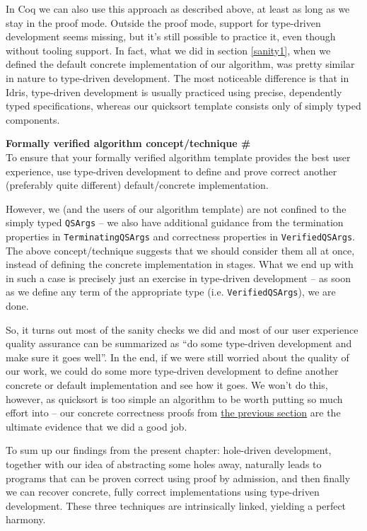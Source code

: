\documentclass[declaration,mgr,english,shortabstract]{iithesis}
\newcommand{\m}[1]{\texttt{#1}}
\newcounter{cnt}
\newcommand{\runcnt}{\#\arabic{cnt}}
\newcommand{\concept}[1]
{
    \refstepcounter{cnt}
    \begin{center}
        \textbf{Formally verified algorithm concept/technique \runcnt} \\
        #1
    \end{center}
}
\begin{document}
In Coq we can also use this approach as described above, at least as long as we stay in the proof mode. Outside the proof mode, support for type-driven development seems missing, but it's still possible to practice it, even though without tooling support. In fact, what we did in section \ref{sanity1}, when we defined the default concrete implementation of our algorithm, was pretty similar in nature to type-driven development. The most noticeable difference is that in Idris, type-driven development is usually practiced using precise, dependently typed specifications, whereas our quicksort template consists only of simply typed components.

\concept{To ensure that your formally verified algorithm template provides the best user experience, use type-driven development to define and prove correct another (preferably quite different) default/concrete implementation.}

However, we (and the users of our algorithm template) are not confined to the simply typed \m{QSArgs} -- we also have additional guidance from the termination properties in \m{TerminatingQSArgs} and correctness properties in \m{VerifiedQSArgs}. The above concept/technique suggests that we should consider them all at once, instead of defining the concrete implementation in stages. What we end up with in such a case is precisely just an exercise in type-driven development -- as soon as we define any term of the appropriate type (i.e. \m{VerifiedQSArgs}), we are done.

So, it turns out most of the sanity checks we did and most of our user experience quality assurance can be summarized as ``do some type-driven development and make sure it goes well''. In the end, if we were still worried about the quality of our work, we could do some more type-driven development to define another concrete or default implementation and see how it goes. We won't do this, however, as quicksort is too simple an algorithm to be worth putting so much effort into -- our concrete correctness proofs from \hyperref[sanity3]{the previous section} are the ultimate evidence that we did a good job.

To sum up our findings from the present chapter: hole-driven development, together with our idea of abstracting some holes away, naturally leads to programs that can be proven correct using proof by admission, and then finally we can recover concrete, fully correct implementations using type-driven development. These three techniques are intrinsically linked, yielding a perfect harmony.
\end{document}
